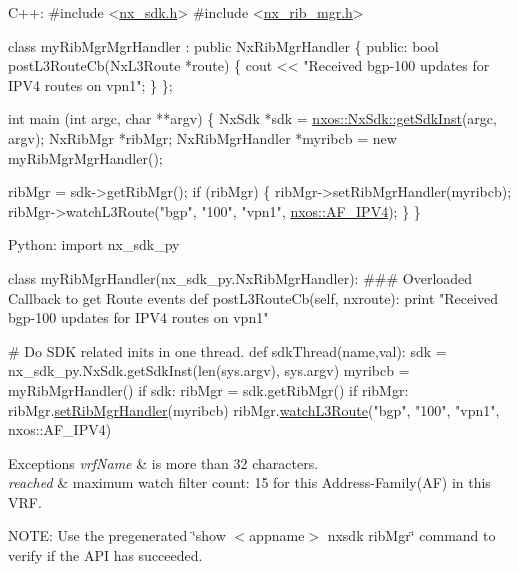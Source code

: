 \begin{DoxyCode}
C++:
\textcolor{preprocessor}{   #include <\mbox{\hyperlink{nx__sdk_8h}{nx\_sdk.h}}>}
\textcolor{preprocessor}{   #include <\mbox{\hyperlink{nx__rib__mgr_8h}{nx\_rib\_mgr.h}}>}

   \textcolor{keyword}{class }myRibMgrMgrHandler : \textcolor{keyword}{public} NxRibMgrHandler \{
      \textcolor{keyword}{public}:
         \textcolor{keywordtype}{bool} postL3RouteCb(NxL3Route *route) \{
              cout << \textcolor{stringliteral}{"Received bgp-100 updates for IPV4 routes on vpn1"};
         \}
   \};

   \textcolor{keywordtype}{int}  main (\textcolor{keywordtype}{int} argc, \textcolor{keywordtype}{char} **argv)
   \{
        NxSdk    *sdk = \mbox{\hyperlink{classnxos_1_1_nx_sdk_a5050e2d26c40744b4fc7862068a83f39}{nxos::NxSdk::getSdkInst}}(argc, argv);
        NxRibMgr *ribMgr;
        NxRibMgrHandler *myribcb = \textcolor{keyword}{new} myRibMgrMgrHandler();

        ribMgr = sdk->getRibMgr();
        \textcolor{keywordflow}{if} (ribMgr) \{
            ribMgr->setRibMgrHandler(myribcb);
            ribMgr->watchL3Route(\textcolor{stringliteral}{"bgp"}, \textcolor{stringliteral}{"100"}, \textcolor{stringliteral}{"vpn1"}, \mbox{\hyperlink{namespacenxos_a3a667f48b94db10aa398940dc5bf72d7a038f37de02a2c9ee1acbc4e184583628}{nxos::AF\_IPV4}});
        \}
   \}

Python:
   \textcolor{keyword}{import} nx\_sdk\_py

   \textcolor{keyword}{class }myRibMgrHandler(nx\_sdk\_py.NxRibMgrHandler):
\textcolor{preprocessor}{   ### Overloaded Callback to get Route events}
         def postL3RouteCb(self, nxroute):
             print "Received bgp-100 updates for IPV4 routes on vpn1"

\textcolor{preprocessor}{   # Do SDK related inits in one thread.}
   def sdkThread(name,val):
       sdk = nx\_sdk\_py.NxSdk.getSdkInst(len(sys.argv), sys.argv)
       myribcb = myRibMgrHandler()
       if sdk:
          ribMgr = sdk.getRibMgr()
          if ribMgr:
             ribMgr.\mbox{\hyperlink{classnxos_1_1_nx_rib_mgr_ac42dd29e34f9c508614733dbec518b99}{setRibMgrHandler}}(myribcb)
             ribMgr.\mbox{\hyperlink{classnxos_1_1_nx_rib_mgr_ab6749ea02f53fc8b2f6cdba21bbc335d}{watchL3Route}}("bgp", "100", "vpn1", nxos::AF\_IPV4)
\end{DoxyCode}



\begin{DoxyExceptions}{Exceptions}
{\em vrf\+Name} & is more than 32 characters. \\
\hline
{\em reached} & maximum watch filter count\+: 15 for this Address-\/\+Family(AF) in this V\+RF.\\
\hline
\end{DoxyExceptions}
N\+O\+TE\+: Use the pregenerated \char`\"{}show $<$appname$>$ nxsdk rib\+Mgr\char`\"{} command to verify if the A\+PI has succeeded. \mbox{\label{classnxos_1_1_nx_rib_mgr_a35e2a52be337d47cd111803f64aca904}} 
